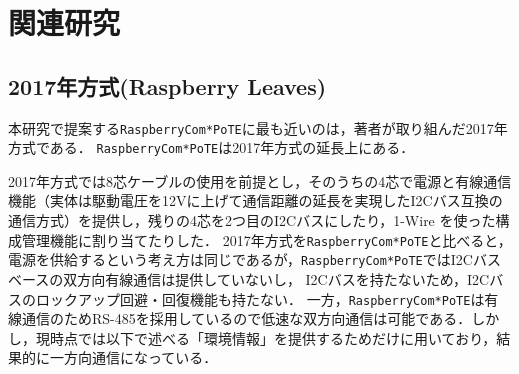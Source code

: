 



\section{関連研究}
\label{sec:03relatedworks}

\subsection{2017年方式(Raspberry Leaves)}

本研究で提案する{\tt Raspberry\-Com*PoTE}に最も近いのは，著者が取り組んだ2017年方式である．
{\tt Raspberry\-Com*PoTE}は2017年方式の延長上にある．

2017年方式では8芯ケーブルの使用を前提とし，そのうちの4芯で電源と有線通信機能（実体は駆動電圧を12Vに上げて通信距離の延長を実現したI2Cバス互換の通信方式）を提供し，残りの4芯を2つ目のI2Cバスにしたり，1-Wire を使った構成管理機能に割り当てたりした．
2017年方式を{\tt Raspberry\-Com*PoTE}と比べると，電源を供給するという考え方は同じであるが，{\tt Raspberry\-Com*PoTE}ではI2Cバスベースの双方向有線通信は提供していないし，
I2Cバスを持たないため，I2Cバスのロックアップ回避・回復機能も持たない．
一方，{\tt Raspberry\-Com*PoTE}は有線通信のためRS-485を採用しているので低速な双方向通信は可能である．しかし，現時点では以下で述べる「環境情報」を提供するためだけに用いており，結果的に一方向通信になっている．

